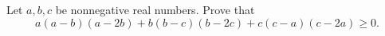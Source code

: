 Let $a,b,c$ be nonnegative real numbers. Prove that \[ a(a - b)(a - 2b) + b(b - c)(b - 2c) + c(c - a)(c - 2a) \geq 0.\]